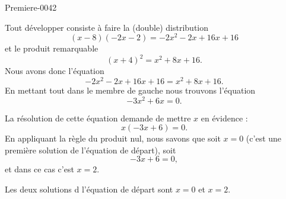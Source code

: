 
\begin{corrige}{Premiere-0042}

    Tout développer consiste à faire la (double) distribution
    \begin{equation}
        (x-8)(-2x-2)=-2x^2-2x+16x+16
    \end{equation}
    et le produit remarquable
    \begin{equation}
        (x+4)^2=x^2+8x+16.
    \end{equation}
    Nous avons donc l'équation
    \begin{equation}
        -2x^2-2x+16x+16=x^2+8x+16.
    \end{equation}
    En mettant tout dans le membre de gauche nous trouvons l'équation
    \begin{equation}
        -3x^2+6x=0.
    \end{equation}

    La résolution de cette équation demande de mettre \( x\) en évidence :
    \begin{equation}
        x(-3x+6)=0.
    \end{equation}
    En appliquant la règle du produit nul, nous savons que soit \( x=0\) (c'est une première solution de l'équation de départ), soit
    \begin{equation}
        -3x+6=0,
    \end{equation}
    et dans ce cas c'est \( x=2\).

    Les deux solutions d l'équation de départ sont \( x=0\) et \( x=2\).
    


\end{corrige}
